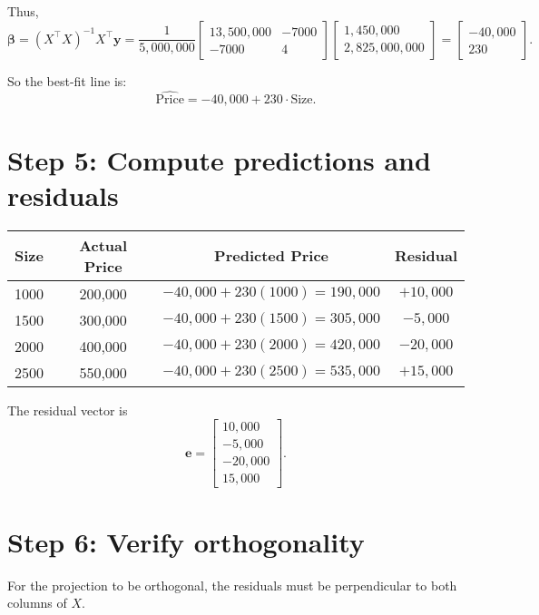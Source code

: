 \documentclass{article}
\begin{document}
Thus,
\[
\boldsymbol{\beta} = (X^\top X)^{-1} X^\top \mathbf{y}
= \frac{1}{5{,}000{,}000}
\begin{bmatrix}
13{,}500{,}000 & -7000 \\
-7000 & 4
\end{bmatrix}
\begin{bmatrix}
1{,}450{,}000 \\
2{,}825{,}000{,}000
\end{bmatrix}
=
\begin{bmatrix}
-40{,}000 \\
230
\end{bmatrix}.
\]

So the best-fit line is:
\[
\widehat{\text{Price}} = -40{,}000 + 230 \cdot \text{Size}.
\]

\section*{Step 5: Compute predictions and residuals}

\begin{center}
\begin{tabular}{c|c|c|c}
Size & Actual Price & Predicted Price & Residual \\
\midrule
1000 & 200{,}000 & $-40{,}000 + 230(1000) = 190{,}000$ & $+10{,}000$ \\
1500 & 300{,}000 & $-40{,}000 + 230(1500) = 305{,}000$ & $-5{,}000$ \\
2000 & 400{,}000 & $-40{,}000 + 230(2000) = 420{,}000$ & $-20{,}000$ \\
2500 & 550{,}000 & $-40{,}000 + 230(2500) = 535{,}000$ & $+15{,}000$ \\
\end{tabular}
\end{center}

The residual vector is
\[
\mathbf{e} = \begin{bmatrix}
10{,}000 \\
-5{,}000 \\
-20{,}000 \\
15{,}000
\end{bmatrix}.
\]

\section*{Step 6: Verify orthogonality}

For the projection to be orthogonal, the residuals must be perpendicular to both columns of $X$.
\end{document}
